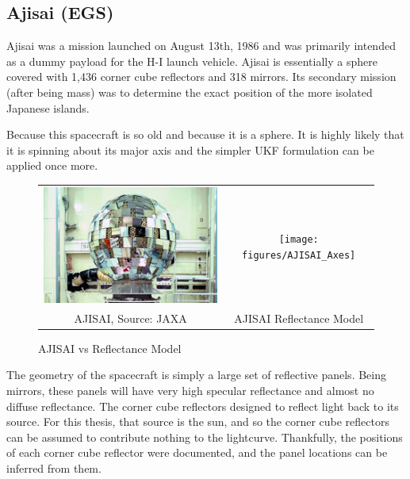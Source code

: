 \subsection{Ajisai (EGS)}

Ajisai was a mission launched on August 13th, 1986 and was primarily intended as a dummy payload for the H-I launch vehicle. \cite{ajisai_jaxa} Ajisai is essentially a sphere covered with 1,436 corner cube reflectors and 318 mirrors. \cite{ajisai} Its secondary mission (after being mass) was to determine the exact position of the more isolated Japanese islands. \cite{ajisai_jaxa}

Because this spacecraft is so old and because it is a sphere. It is highly likely that it is spinning about its major axis and the simpler UKF formulation can be applied once more.

\begin{figure}[!ht]
	\begin{tabular}{cc}
	\includegraphics[width = 90mm]{figures/ajisai.jpg} & \texttt{[image: figures/AJISAI\_Axes]} \\
	AJISAI, Source: JAXA & AJISAI Reflectance Model
	\end{tabular}
	\caption{AJISAI vs Reflectance Model}
\end{figure}



The geometry of the spacecraft is simply a large set of reflective panels. Being mirrors, these panels will have very high specular reflectance and almost no diffuse reflectance. The corner cube reflectors designed to reflect light back to its source. For this thesis, that source is the sun, and so the corner cube reflectors can be assumed to contribute nothing to the lightcurve. Thankfully, the positions of each corner cube reflector were documented, and the panel locations can be inferred from them.

